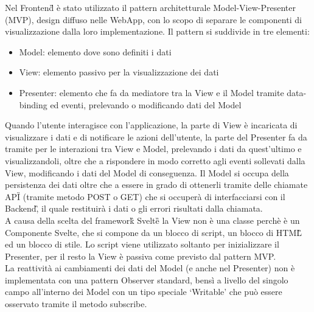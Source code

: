 Nel Frontend\G{} è stato utilizzato il pattern architetturale Model-View-Presenter (MVP), design diffuso nelle WebApp, con lo scopo di separare le componenti di
visualizzazione dalla loro implementazione.
Il pattern si suddivide in tre elementi:
\begin{itemize}
    \item Model: elemento dove sono definiti i dati
    \item View: elemento passivo per la visualizzazione dei dati
    \item Presenter: elemento che fa da mediatore tra la View e il Model tramite data-binding ed eventi, prelevando o modificando dati del Model 
\end{itemize}
Quando l'utente interagisce con l'applicazione, la parte di View è incaricata di visualizzare i dati 
e di notificare le azioni dell'utente, la parte del Presenter fa da tramite per le interazioni tra View e Model, prelevando i dati da quest'ultimo e visualizzandoli, 
oltre che a rispondere in modo corretto agli eventi sollevati dalla View, modificando i dati del Model di conseguenza.
Il Model si occupa della persistenza dei dati oltre che a essere in grado di ottenerli tramite delle chiamate API\G{} (tramite metodo POST o GET) che si occuperà di interfacciarsi con
il Backend\G, il quale restituirà i dati o gli errori risultati dalla chiamata. \\
A causa della scelta del framework\G{} Svelte\G{} la View non è una classe perchè è un Componente Svelte, 
che si compone da un blocco di script, un blocco di HTML\G{} ed un blocco di stile.
Lo script viene utilizzato soltanto per inizializzare il Presenter, per il resto la View è passiva come previsto dal pattern MVP.\\
La reattività ai cambiamenti dei dati del Model (e anche nel Presenter) non è implementata con una pattern Observer standard,
bensì a livello del singolo campo all'interno dei Model con un tipo speciale `Writable' che può essere osservato tramite il metodo subscribe.

